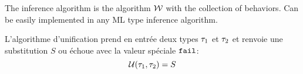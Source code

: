 \documentclass[9pt,preprint]{sigplanconf}
\begin{document}

The inference algorithm is the algorithm $\mathcal{W}$ with the collection of behaviors. Can be easily implemented in any ML type inference algorithm.

L'algorithme d'unification prend en entrée deux types $\tau_1$ et $\tau_2$ et renvoie une substitution $S$ ou échoue avec la valeur spéciale $\mathtt{fail}$:
\[  \mathcal{U}(\tau_1, \tau_2) = S \]
\end{document}
